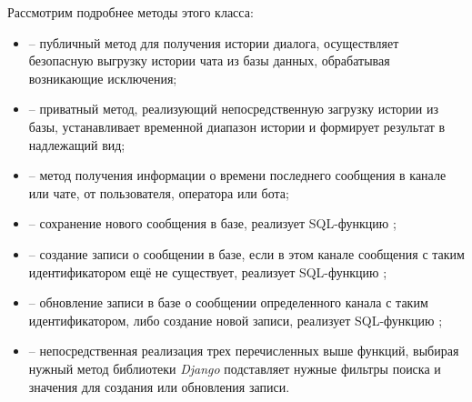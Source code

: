     Рассмотрим подробнее методы этого класса:
    \begin{itemize}
        \item {} -- публичный метод для получения истории диалога, осуществляет
        безопасную выгрузку истории чата из базы данных, обрабатывая возникающие исключения;
        \item {} -- приватный метод, реализующий непосредственную загрузку истории из базы,
        устанавливает временной диапазон истории и формирует результат в надлежащий вид;
        \item {} -- метод получения информации о времени последнего сообщения
        в канале или чате, от пользователя, оператора или бота;
        \item {} -- сохранение нового сообщения в базе, реализует SQL-функцию ;
        \item {} -- создание записи о сообщении в базе, если в этом канале сообщения с таким
        идентификатором ещё не существует, реализует SQL-функцию ;
        \item {} -- обновление записи в базе о сообщении определенного канала с таким
        идентификатором, либо создание новой записи, реализует SQL-функцию ;
        \item {} -- непосредственная реализация трех перечисленных выше функций,
        выбирая нужный метод библиотеки \textit{Django} подставляет нужные фильтры поиска и значения для создания
        или обновления записи.
    \end{itemize}

